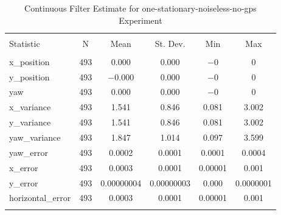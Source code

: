 
\begin{table}[h] \centering 
  \caption{Continuous Filter Estimate for one-stationary-noiseless-no-gps Experiment} 
  \label{tab:one_stationary_noiseless_no_gps_continuous_summary} 
\begin{tabular}{@{\extracolsep{5pt}}lccccc} 
\\[-1.8ex]\hline 
\hline \\[-1.8ex] 
Statistic & \multicolumn{1}{c}{N} & \multicolumn{1}{c}{Mean} & \multicolumn{1}{c}{St. Dev.} & \multicolumn{1}{c}{Min} & \multicolumn{1}{c}{Max} \\ 
\hline \\[-1.8ex] 
x\_position & 493 & 0.000 & 0.000 & $-$0 & 0 \\ 
y\_position & 493 & $-$0.000 & 0.000 & $-$0 & 0 \\ 
yaw & 493 & 0.000 & 0.000 & $-$0 & 0 \\ 
x\_variance & 493 & 1.541 & 0.846 & 0.081 & 3.002 \\ 
y\_variance & 493 & 1.541 & 0.846 & 0.081 & 3.002 \\ 
yaw\_variance & 493 & 1.847 & 1.014 & 0.097 & 3.599 \\ 
yaw\_error & 493 & 0.0002 & 0.0001 & 0.0001 & 0.0004 \\ 
x\_error & 493 & 0.0003 & 0.0001 & 0.00001 & 0.001 \\ 
y\_error & 493 & 0.00000004 & 0.00000003 & 0.000 & 0.0000001 \\ 
horizontal\_error & 493 & 0.0003 & 0.0001 & 0.00001 & 0.001 \\ 
\hline \\[-1.8ex] 
\end{tabular} 
\end{table} 
